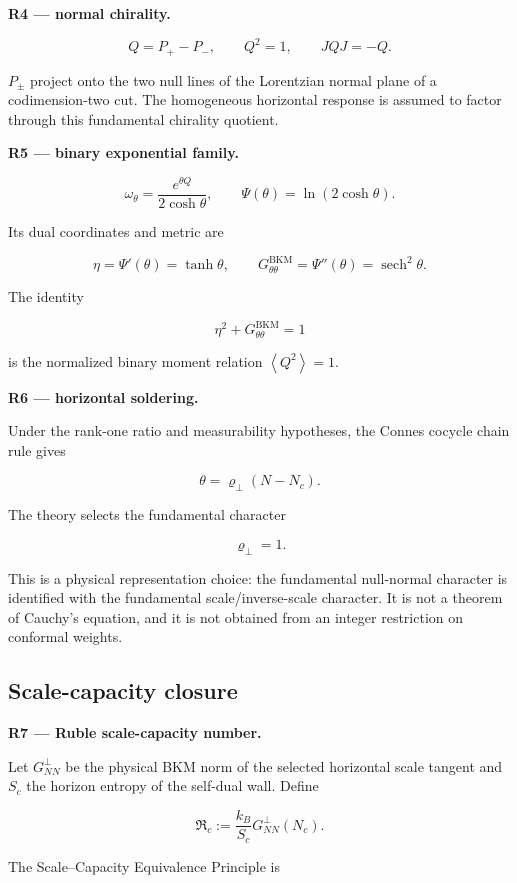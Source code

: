 \documentclass[
  11pt,
  letterpaper,
]{article}
\begin{document}
\textbf{R4 --- normal chirality.}

\[
\boxed{
Q=P_+-P_-,
\qquad
Q^2=1,
\qquad
JQJ=-Q.
}
\]

\(P_\pm\) project onto the two null lines of the Lorentzian normal plane
of a codimension-two cut. The homogeneous horizontal response is assumed
to factor through this fundamental chirality quotient.

\textbf{R5 --- binary exponential family.}

\[
\boxed{
\omega_\theta=\frac{e^{\theta Q}}{2\cosh\theta},
\qquad
\Psi(\theta)=\ln(2\cosh\theta).
}
\]

Its dual coordinates and metric are

\[
\boxed{
\eta=\Psi'(\theta)=\tanh\theta,
\qquad
G^{\mathrm{BKM}}_{\theta\theta}=\Psi''(\theta)=\operatorname{sech}^2\theta.
}
\]

The identity

\[
\boxed{
\eta^2+G^{\mathrm{BKM}}_{\theta\theta}=1
}
\]

is the normalized binary moment relation
\(\left\langle Q^2\right\rangle=1\).

\textbf{R6 --- horizontal soldering.}

Under the rank-one ratio and measurability hypotheses, the Connes
cocycle chain rule gives

\[
\theta=\varrho_\perp(N-N_c).
\]

The theory selects the fundamental character

\[
\boxed{\varrho_\perp=1.}
\]

This is a physical representation choice: the fundamental null-normal
character is identified with the fundamental scale/inverse-scale
character. It is not a theorem of Cauchy's equation, and it is not
obtained from an integer restriction on conformal weights.

\subsection{Scale-capacity closure}\label{scale-capacity-closure}

\textbf{R7 --- Ruble scale-capacity number.}

Let \(G^{\perp}_{NN}\) be the physical BKM norm of the selected
horizontal scale tangent and \(S_c\) the horizon entropy of the
self-dual wall. Define

\[
\boxed{
\mathfrak R_c:=\frac{k_B}{S_c}G^{\perp}_{NN}(N_c).
}
\]

The Scale--Capacity Equivalence Principle is
\end{document}
